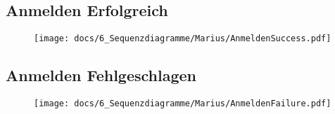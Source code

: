 \subsection*{Anmelden Erfolgreich}
\vfill
\begin{figure}[h!]
	\centering
	\texttt{[image: docs/6\_Sequenzdiagramme/Marius/AnmeldenSuccess.pdf]}
	\label{fig:SeqDia_Anmelden_Erfolgreich}
\end{figure}

\vfill
\pagebreak

\subsection*{Anmelden Fehlgeschlagen}
\vfill
\begin{figure}[h!]
	\centering
	\texttt{[image: docs/6\_Sequenzdiagramme/Marius/AnmeldenFailure.pdf]}
	\label{fig:SeqDia_Anmelden_Fehlgeschlagen}
\end{figure}

\vfill